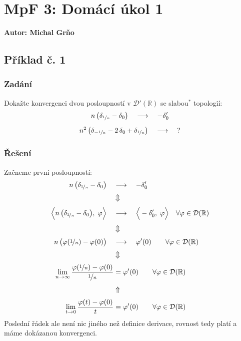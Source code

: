 \documentclass{article}
\def\R{\mathbb{R}}
\def\D{\mathcal{D}}
\begin{document}
\section*{MpF 3: Domácí úkol 1}
\textbf{Autor: Michal Grňo}

\subsection*{Příklad č. 1}
\subsubsection*{Zadání}
Dokažte konvergenci dvou posloupností v $\D'(\R)$ se slabou$^*$ topologií:
\begin{gather*}
    n \, \big( \delta_{\nicefrac{1}{n}} - \delta_0 \big)
    \quad \longrightarrow \quad
    -\delta_0 '
    \\[5pt]
    n^2 \, \big(
        \delta_{-\nicefrac{1}{n}}
        -2 \, \delta_0
        + \delta_{\nicefrac{1}{n}}
    \big)
    \quad \longrightarrow \quad
    \text{?}
\end{gather*}

\subsubsection*{Řešení}
Začneme první posloupností:
\begin{align*}
    n \, \big( \delta_{\nicefrac{1}{n}} - \delta_0 \big)
    \quad &\longrightarrow \quad
    -\delta_0 '
    \\[3pt]
    &\Updownarrow
    \\[3pt]
    \Big< n \, \big( \delta_{\nicefrac{1}{n}} - \delta_0 \big), \; \varphi \Big>
    \quad &\longrightarrow \quad
    \Big< -\delta_0 ', \; \varphi \Big>
    \quad \forall \varphi \in \D(\R)
    \\[3pt]
    &\Updownarrow
    \\[3pt]
    n \, \big( \varphi(\nicefrac{1}{n}) - \varphi(0) \big)
    \quad &\longrightarrow \quad
    \varphi'(0)
    \qquad \forall \varphi \in \D(\R)
    \\[3pt]
    &\Updownarrow
    \\[3pt]
    \lim_{n \to \infty} \frac{ \varphi(\nicefrac{1}{n}) - \varphi(0) }{\nicefrac{1}{n}}
    &= \varphi'(0)
    \qquad \forall \varphi \in \D(\R)
    \\[3pt]
    &\Uparrow
    \\[3pt]
    \lim_{t \to 0} \frac{ \varphi(t) - \varphi(0) }{t}
    &= \varphi'(0)
    \qquad \forall \varphi \in \D(\R)
\end{align*}
Poslední řádek ale není nic jiného než definice derivace, rovnost tedy platí a máme dokázanou konvergenci.
\end{document}
